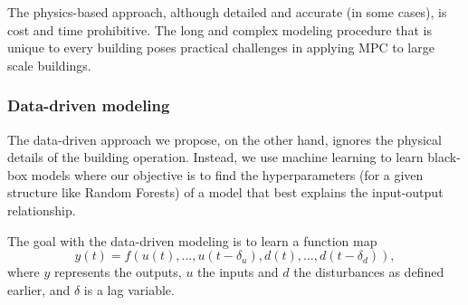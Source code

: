 \textcolor[rgb]{0,0,1}{The physics-based approach, although detailed and accurate (in some cases), is cost and time prohibitive. The long and complex modeling procedure that is unique to every building poses practical challenges in applying MPC to large scale buildings.}

\subsubsection{Data-driven modeling}
\textcolor[rgb]{0,0,1}{The data-driven approach we propose, on the other hand, ignores the physical details of the building operation. Instead, we use machine learning to learn black-box models where our objective is to find the hyperparameters (for a given structure like Random Forests) of a model that best explains the input-output relationship.}

\textcolor[rgb]{0,0,1}{The goal with the data-driven modeling is to learn a function map
\begin{equation}
\label{E:MLexample}
y(t) = f(u(t),\dots,u(t-\delta_u), d(t),\dots, d(t-\delta_d)),
\end{equation}
where \(y\) represents the outputs, \(u\) the inputs and \(d\) the disturbances as defined earlier, and \(\delta\) is a lag variable.}

